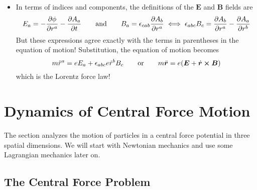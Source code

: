 \documentclass[11pt, a4paper]{article}
\newcommand{\eqtext}[1]{\qquad \text{#1} \qquad}
\newcommand{\bdot}[1]{\dot{\bm{#1}}} %
\newcommand{\bddot}[1]{\ddot{\bm{#1}}} %
\begin{document}
\begin{itemize}
	\item In terms of indices and components, the definitions of the $ \bm{E} $ and $ \bm{B} $ fields are
	\begin{equation*}
		E_{a} = -\pdv{\phi}{r^{a}} - \pdv{A_{a}}{t} \eqtext{and}  B_{a} = \epsilon_{cab}\pdv{A_{b}}{r^{a}} \iff \epsilon_{abc}B_{c} = \pdv{A_{b}}{r^{a}} - \pdv{A_{a}}{r^{b}}
	\end{equation*}
	But these expressions agree exactly with the terms in parentheses in the equation of motion! Substitution, the equation of motion becomes
	\begin{equation*}
		m\ddot{r}^{a} = e E_{a} + \epsilon_{abc} e \dot{r}^{b} B_{c} \eqtext{or} m \bddot{r} = e (\bm{E} + \bdot{r} \cross \bm{B})
	\end{equation*}
	which is the Lorentz force law!
	
\end{itemize}


\newpage
\section{Dynamics of Central Force Motion}
The section analyzes the motion of particles in a central force potential in three spatial dimensions. We will start with Newtonian mechanics and use some Lagrangian mechanics later on.

\subsection{The Central Force Problem}
\end{document}
